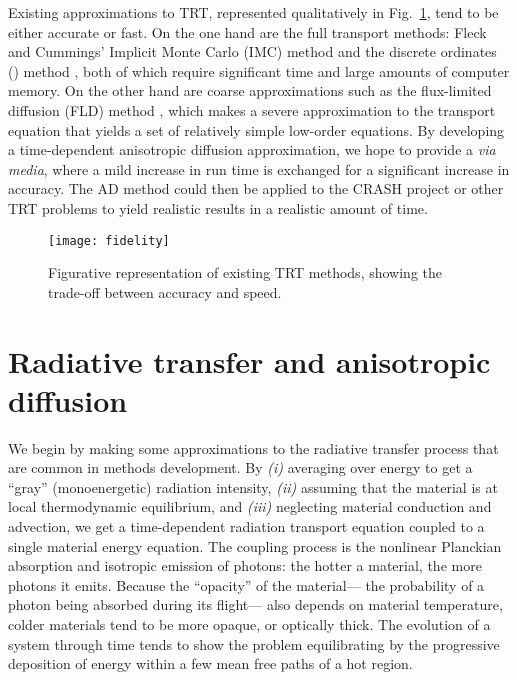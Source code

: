 Existing approximations to TRT, represented qualitatively in
Fig.~\ref{fig:fidelity}, tend to be either accurate or fast. On
the one hand are the full transport methods: Fleck and Cummings' Implicit Monte
Carlo (IMC) method \cite{Fle1971} and the discrete ordinates (\SN) method
\cite{Ada1998a}, both of which require significant time and large amounts of
computer memory. On the other hand are coarse approximations such as the
flux-limited diffusion (FLD) method \cite{Ols2000}, which makes a severe
approximation to the transport equation that yields a set of relatively simple
low-order equations. By developing a
time-dependent anisotropic diffusion approximation, we hope to provide a
\emph{via media}, where a mild increase in run time is exchanged for a
significant increase in
accuracy. The AD method could then be applied to the CRASH project or
other TRT problems to yield
realistic results in a realistic amount of time.

\begin{figure}[htb]
  \centering
  \texttt{[image: fidelity]}
  \caption{Figurative representation of existing TRT methods, showing the
  trade-off between accuracy and speed.}
  \label{fig:fidelity}
\end{figure}

\section{Radiative transfer and anisotropic diffusion}
We begin by making some approximations to the radiative transfer
process that are common in methods development. By
\textsl{(i)} averaging over energy to get a ``gray'' (monoenergetic) radiation
intensity,
\textsl{(ii)} assuming that the material is at local thermodynamic equilibrium,
and
\textsl{(iii)} neglecting material conduction and advection,
we get a time-dependent radiation transport equation coupled to a single
material energy equation. The coupling process is the nonlinear Planckian
absorption and isotropic emission of photons: the hotter a material, the more
photons it emits.  Because the ``opacity'' of the material---%
the probability of a photon being absorbed during its flight---%
also depends on material temperature, colder materials tend to be more opaque,
or optically thick. The evolution of a system through time tends to show the
problem equilibrating by the progressive deposition of energy within a few mean
free paths of a hot region.

